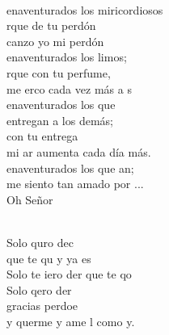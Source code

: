 \documentclass[12pt]{article}
\begin{document}
\begin{multicols*}{2}
\begin{cancion}
\begin{chorus}
	\end{chorus}%
	\jump\\
	enaventurados los miricordiosos\\
	rque de tu perdón \\
	canzo yo mi perdón\\
	enaventurados los limos;\\
	rque con tu perfume,\\
	me erco cada vez más a s \\
\jump
	enaventurados los que \\
	 entregan a los demás;\\
	con tu entrega \\
	mi ar aumenta cada día más.\\
	enaventurados los que an;\\
	 me siento tan amado por ...\\
	Oh Señor  \\\jump\\
	\begin{chorus}%
	Solo quro dec\\
	que te qu y ya es\\
	Solo te iero der que te qo\\
	Solo qero der\\
	gracias perdoe\\
	y querme y ame l como y.\\
	\end{chorus}%
	\jump\\
\end{cancion}%


\end{multicols*}
\end{document}
